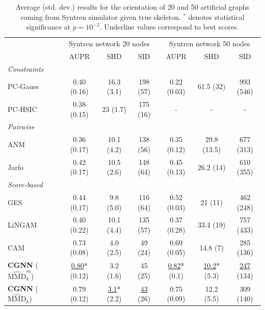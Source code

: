 \documentclass[a4paper, 11pt]{article}
\begin{document}
\begin{table}[h!]
  \caption{Average (std. dev.) results for the orientation of 20 and 50 artificial graphs coming from Syntren simulator given true skeleton. $^*$ denotes statistical significance at $p=10^{-2}$. Underline values correspond to best scores.}
  \footnotesize
  \hspace*{-1.5cm}
    \centering
  \begin{tabular}{l|ccc|ccc|}
    \toprule
     &  \multicolumn{3}{c}{Syntren network 20 nodes} &  \multicolumn{3}{c}{Syntren network 50 nodes} \\
     & AUPR & SHD & SID & AUPR & SHD & SID  \\
    \midrule
    \textit{Constraints}\\
    PC-Gauss & 0.40 (0.16) & 16.3 (3.1) & 198 (57) & 0.22 (0.03) & 61.5 (32) & 993 (546) \\
    PC-HSIC & 0.38 (0.15) & 23 (1.7) & 175 (16) & - & - & -  \\
    \midrule
    \textit{Pairwise}\\
    ANM & 0.36 (0.17) & 10.1 (4.2) & 138 (56) & 0.35 (0.12) & 29.8 (13.5) & 677 (313) \\
    Jarfo & 0.42 (0.17)  & 10.5 (2.6) & 148 (64) & 0.45 (0.13) & 26.2 (14) & 610 (355)\\
    \midrule
    \textit{Score-based}\\
        GES & 0.44 (0.17) & 9.8 (5.0) & 116 (64) & 0.52 (0.03) & 21 (11) & 462 (248)\\ 
     LiNGAM & 0.40 (0.22) & 10.1 (4.4) & 135 (57) & 0.37 (0.28) & 33.4 (19) & 757 (433)   \\
     CAM & 0.73 (0.08)  & 4.0 (2.5) & 49 (24) & 0.69 (0.05) & 14.8 (7) & 285 (136) \\    
    \textbf{CGNN} ($\widehat{\text{MMD}}^m_k$) & \underline{0.80}* (0.12) &  3.2 (1.6) & 45 (25) & \underline{0.82}* (0.1) & \underline{10.2}* (5.3) & \underline{247} (134)  \\
    \textbf{CGNN} ($\widehat{\text{MMD}}_k$) & 0.79 (0.12) & \underline{3.1}* (2.2) & \underline{43} (26) & 0.75 (0.09) & 12.2 (5.5) & 309 (140) \\
    \bottomrule
  \end{tabular}
   \hspace*{-2cm}
  \label{table:syntren_network}
\end{table}
\end{document}
